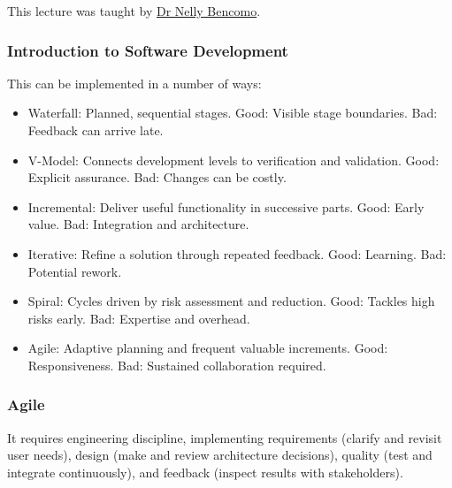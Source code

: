 This lecture was taught by \hyperref[lecturer-nellybencomo]{Dr Nelly Bencomo}.

\subsubsection{Introduction to Software Development}

This can be implemented in a number of ways:
\begin{itemize}
    \item Waterfall: Planned, sequential stages. Good: Visible stage boundaries. Bad: Feedback can arrive late.
    \item V-Model: Connects development levels to verification and validation. Good: Explicit assurance. Bad: Changes can be costly.
    \item Incremental: Deliver useful functionality in successive parts. Good: Early value. Bad: Integration and architecture.
    \item Iterative: Refine a solution through repeated feedback. Good: Learning. Bad: Potential rework.
    \item Spiral: Cycles driven by risk assessment and reduction. Good: Tackles high risks early. Bad: Expertise and overhead.
    \item Agile: Adaptive planning and frequent valuable increments. Good: Responsiveness. Bad: Sustained collaboration required.
\end{itemize}

\subsubsection{Agile}


It requires engineering discipline, implementing requirements (clarify and revisit user needs), design (make and review architecture decisions), quality (test and integrate continuously), and feedback (inspect results with stakeholders).

